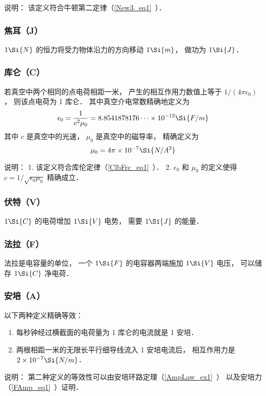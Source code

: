 说明： 该定义符合牛顿第二定律（\autoref{New3_eq1}~）．

\subsubsection{焦耳（J）}
$1\Si{N}$ 的恒力将受力物体沿力的方向移动 $1\Si{m}$， 做功为 $1\Si{J}$．

\subsubsection{库仑（C）}
若真空中两个相同的点电荷相距一米， 产生的相互作用力数值上等于 $1/(4\pi\epsilon_0)$， 则该点电荷为 1 库仑． 其中真空介电常数精确地定义为
\begin{equation}
\epsilon_0 = \frac{1}{c^2 \mu_0} = 8.8541878176\dots \times 10^{-12} \Si{F/m}
\end{equation}
其中 $c$ 是真空中的光速， $\mu_0$ 是真空中的磁导率， 精确定义为
\begin{equation}
\mu_0 = 4\pi \times 10^{-7} \Si{N/A^2}
\end{equation}

说明： 1. 该定义符合库伦定律（\autoref{ClbFrc_eq1}~）． 2. $\epsilon_0$ 和 $\mu_0$ 的定义使得 $c = 1/\sqrt{\epsilon_0 \mu_0}$ 精确成立．

\subsubsection{伏特（V）}
$1\Si{C}$ 的电荷增加 $1\Si{V}$ 电势， 需要 $1\Si{J}$ 的能量．

\subsubsection{法拉（F）}
法拉是电容量的单位， 一个 $1\Si{F}$ 的电容器两端施加 $1\Si{V}$ 电压， 可以储存 $1\Si{C}$ 净电荷．

\subsubsection{安培（A）}
以下两种定义精确等效：
\begin{enumerate}
\item 每秒钟经过横截面的电荷量为 1 库仑的电流就是 1 安培．
\item 两根相距一米的无限长平行细导线流入 1 安培电流后， 相互作用力是 $2 \times 10^{-7}\Si{N/m}$． 
\end{enumerate}

说明： 第二种定义的等效性可以由安培环路定理（\autoref{AmpLaw_ex1}~） 以及安培力（\autoref{FAmp_eq1}~）证明．

